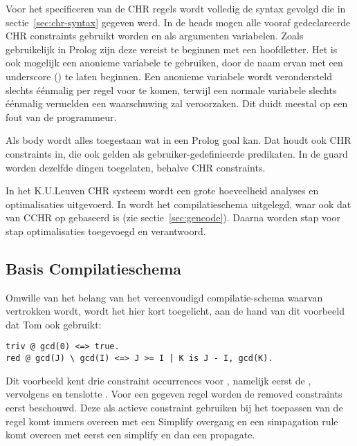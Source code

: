 Voor het specificeren van de CHR regels wordt volledig de syntax gevolgd die in sectie~\ref{sec:chr-syntax} gegeven werd. In de heads mogen alle vooraf gedeclareerde CHR constraints gebruikt worden en als argumenten variabelen. Zoals gebruikelijk in Prolog zijn deze vereist te beginnen met een hoofdletter. Het is ook mogelijk een anonieme variabele te gebruiken, door de naam ervan met een underscore (\code{\_}) te laten beginnen. Een anonieme variabele wordt verondersteld slechts \'e\'enmalig per regel voor te komen, terwijl een normale variabele slechts \'e\'enmalig vermelden een waarschuwing zal veroorzaken. Dit duidt meestal op een fout van de programmeur.

Als body wordt alles toegestaan wat in een Prolog goal kan. Dat houdt ook CHR constraints in, die ook gelden als gebruiker-gedefinieerde predikaten. In de guard worden dezelfde dingen toegelaten, behalve CHR constraints.

In het K.U.Leuven CHR systeem wordt een grote hoeveelheid analyses en optimalisaties uitgevoerd. In \cite{tomsphdthesis} wordt het compilatieschema uitgelegd, waar ook dat van CCHR op gebaseerd is (zie sectie~\ref{sec:gencode}). Daarna worden stap voor stap optimalisaties toegevoegd en verantwoord. 

\subsection{Basis Compilatieschema} \label{sec:schema}

Omwille van het belang van het vereenvoudigd compilatie-schema waarvan vertrokken wordt, wordt het hier kort toegelicht, aan de hand van dit voorbeeld dat Tom ook gebruikt: \begin{Verbatim}[frame=single]
triv @ gcd(0) <=> true.
red @ gcd(J) \ gcd(I) <=> J >= I | K is J - I, gcd(K).
\end{Verbatim}

Dit voorbeeld kent drie constraint occurrences voor , namelijk eerst de , vervolgens  en tenslotte . Voor een gegeven regel worden de removed constraints eerst beschouwd. Deze als actieve constraint gebruiken bij het toepassen van de regel komt immers overeen met een Simplify overgang en een simpagation rule komt overeen met eerst een simplify en dan een propagate.


